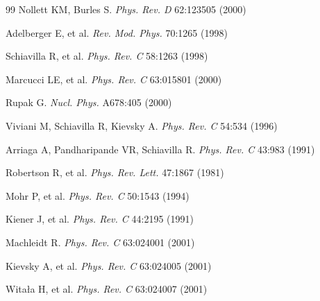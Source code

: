 \begin{thebibliography}{99}
Nollett KM, Burles S.
{\it Phys. Rev. D} 62:123505 (2000)

Adelberger E, et al.
{\it Rev. Mod. Phys.} 70:1265 (1998)

Schiavilla R, et al.
{\it Phys. Rev. C} 58:1263 (1998)

Marcucci LE, et al.
{\it Phys. Rev. C} 63:015801 (2000)

Rupak G.
{\it Nucl. Phys.} A678:405 (2000)

Viviani M, Schiavilla R, Kievsky A.
{\it Phys. Rev. C} 54:534 (1996)

Arriaga A, Pandharipande VR, Schiavilla R.
{\it Phys. Rev. C} 43:983 (1991)

Robertson R, et al.
{\it Phys. Rev. Lett.} 47:1867 (1981)

Mohr P, et al.
{\it Phys. Rev. C} 50:1543 (1994)

Kiener J, et al.
{\it Phys. Rev. C} 44:2195  (1991)

Machleidt R.
{\it Phys. Rev. C} 63:024001 (2001)

Kievsky A, et al.
{\it Phys. Rev. C} 63:024005 (2001)

Wita{\l}a H, et al.
{\it Phys. Rev. C} 63:024007 (2001)

\end{thebibliography}


